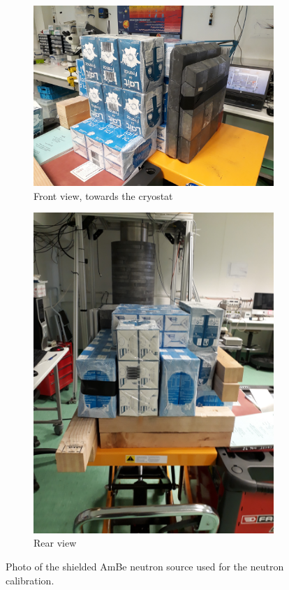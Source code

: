 \begin{figure}
\centering
\begin{subfigure}{.5\textwidth}
  \centering
  \includegraphics[width=\linewidth]{Figures/Neutron/photo_source_front.jpg}
  \caption{Front view, towards the cryostat}
  \label{fig:photo-source-frontt}
\end{subfigure}%
\begin{subfigure}{0.5\textwidth}
  \centering
  \includegraphics[width=\linewidth, angle=-90]{Figures/Neutron/photo_source_rear.jpg}
  \caption{Rear view}
  \label{fig:photo-source-rear}
\end{subfigure}
\caption{Photo of the shielded AmBe neutron source used for the neutron calibration.}
\label{fig:photo-source}
\end{figure}

